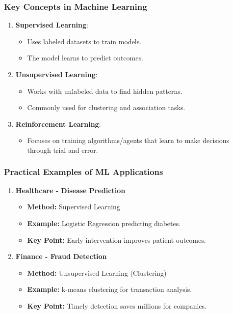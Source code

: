 \documentclass[aspectratio=169]{beamer}
\begin{document}
\begin{frame}[fragile]
    \frametitle{Key Concepts in Machine Learning}
    \begin{enumerate}
        \item \textbf{Supervised Learning}:
            \begin{itemize}
                \item Uses labeled datasets to train models.
                \item The model learns to predict outcomes.
            \end{itemize}
        \item \textbf{Unsupervised Learning}:
            \begin{itemize}
                \item Works with unlabeled data to find hidden patterns.
                \item Commonly used for clustering and association tasks.
            \end{itemize}
        \item \textbf{Reinforcement Learning}:
            \begin{itemize}
                \item Focuses on training algorithms/agents that learn to make decisions through trial and error.
            \end{itemize}
    \end{enumerate}
\end{frame}

\begin{frame}[fragile]
    \frametitle{Practical Examples of ML Applications}
    \begin{enumerate}
        \item \textbf{Healthcare - Disease Prediction}
            \begin{itemize}
                \item \textbf{Method:} Supervised Learning
                \item \textbf{Example:} Logistic Regression predicting diabetes.
                \item \textbf{Key Point:} Early intervention improves patient outcomes.
            \end{itemize}
        \item \textbf{Finance - Fraud Detection}
            \begin{itemize}
                \item \textbf{Method:} Unsupervised Learning (Clustering)
                \item \textbf{Example:} k-means clustering for transaction analysis.
                \item \textbf{Key Point:} Timely detection saves millions for companies.
            \end{itemize}
    \end{enumerate}
\end{frame}
\end{document}
